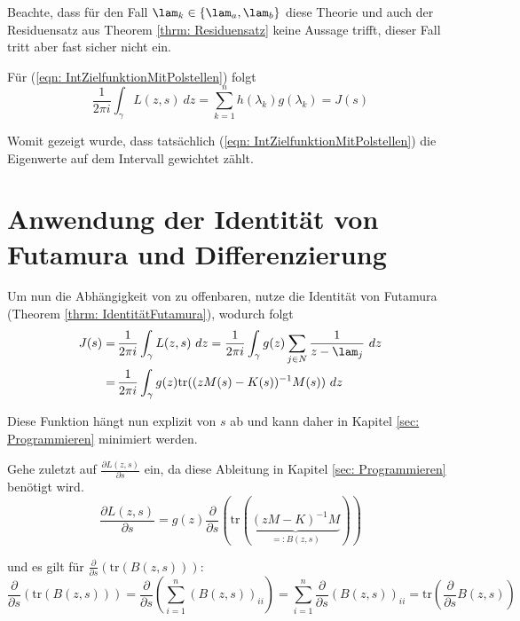 \documentclass[a4paper,12pt]{report}
\newcommand{\zitat}[1]{\glqq #1\grqq}
\newcommand{\klammer}[1]{\left(#1\right)}
\newcommand{\tr}{\text{tr}}
\newcommand{\inv}{^{-1}}
\newcommand{\1}{\mathds{1}}
\theoremstyle{plain} %
\theoremstyle{definition} %
\theoremstyle{remark}
\begin{document}
            Beachte, dass für den Fall $\lam_k \in \{\lam_a, \lam_b\}$ diese Theorie und auch der Residuensatz aus Theorem \ref{thrm: Residuensatz} keine Aussage trifft, dieser Fall tritt aber fast sicher nicht ein.

            Für (\ref{eqn: IntZielfunktionMitPolstellen}) folgt
            $$\frac 1 {2\pi i}\int_\gamma L(z,s)\ dz = \sum_{k=1}^{n} h(\lambda_k) g(\lambda_k) = J(s)$$

            Womit gezeigt wurde, dass tatsächlich (\ref{eqn: IntZielfunktionMitPolstellen}) die Eigenwerte auf dem Intervall gewichtet zählt.

      \section{Anwendung der Identität von Futamura und Differenzierung}
            
            Um nun die Abhängigkeit von \s zu offenbaren, nutze die Identität von Futamura (Theorem \ref{thrm: IdentitätFutamura}), wodurch folgt     
            \begin{align}
                  J(s) =&\, \frac 1 {2\pi i}\int_\gamma L(z,s)\ dz = \frac 1 {2\pi i}\int_\gamma g(z)\sum_{j\in N} \frac{1}{z-\lam_j}\ dz\nonumber\\
                  =&\, \frac 1 {2\pi i}\int_\gamma g(z)\tr((zM(s)-K(s))\inv M(s))\ dz\label{eqn: JGleichIntTr}
            \end{align}

            Diese Funktion hängt nun explizit von $s$ ab und kann daher in Kapitel \ref{sec: Programmieren} minimiert werden.
            
            Gehe zuletzt auf $\frac{\partial L(z,s)}{\partial s}$ ein, da diese Ableitung in Kapitel \ref{sec: Programmieren} benötigt wird.
            \begin{equation}
                  \label{eqn: AbleitungZielfunktion}
                  \frac{\partial L(z,s)}{\partial s} = g(z) \frac{\partial}{\partial s}\klammer{\tr(\underbrace{(zM-K)\inv M}_{=:B(z, s)})}
            \end{equation}

            und es gilt für $\frac{\partial}{\partial s} \klammer{\tr(B(z, s))}$:
            $$\frac{\partial}{\partial s} \klammer{\tr(B(z, s))} = \frac{\partial}{\partial s} \klammer{\sum_{i=1}^n (B(z, s))_{ii}} = \sum_{i=1}^n \frac{\partial}{\partial s} (B(z,s))_{ii} = \tr\klammer{\frac{\partial}{\partial s} B(z,s)}$$
            
\end{document}
